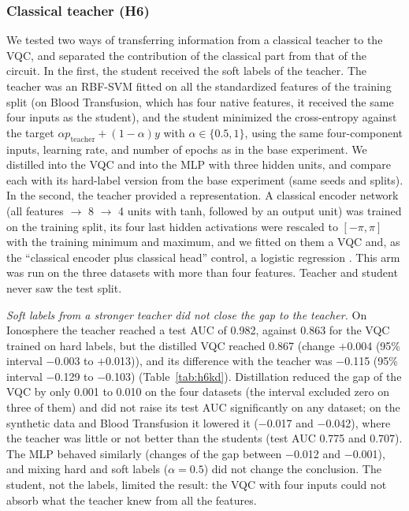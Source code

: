 \subsubsection{Classical teacher (H6)}

We tested two ways of transferring information from a classical teacher to the VQC, and separated the contribution of the classical part from that of the circuit. In the first, the student received the soft labels of the teacher. The teacher was an RBF-SVM fitted on all the standardized features of the training split (on Blood Transfusion, which has four native features, it received the same four inputs as the student), and the student minimized the cross-entropy against the target $\alpha p_{\mathrm{teacher}}+(1-\alpha)y$ with $\alpha\in\{0.5,1\}$, using the same four-component inputs, learning rate, and number of epochs as in the base experiment. We distilled into the VQC and into the MLP with three hidden units, and compare each with its hard-label version from the base experiment (same seeds and splits). In the second, the teacher provided a representation. A classical encoder network (all features $\rightarrow$ 8 $\rightarrow$ 4 units with tanh, followed by an output unit) was trained on the training split, its four last hidden activations were rescaled to $[-\pi,\pi]$ with the training minimum and maximum, and we fitted on them a VQC and, as the ``classical encoder plus classical head'' control, a logistic regression \cite{kolle2024}. This arm was run on the three datasets with more than four features. Teacher and student never saw the test split.

\textit{Soft labels from a stronger teacher did not close the gap to the teacher.} On Ionosphere the teacher reached a test AUC of 0.982, against 0.863 for the VQC trained on hard labels, but the distilled VQC reached 0.867 (change $+$0.004 (95\% interval $-$0.003 to $+$0.013)), and its difference with the teacher was $-$0.115 (95\% interval $-$0.129 to $-$0.103) (Table~\ref{tab:h6kd}). Distillation reduced the gap of the VQC by only 0.001 to 0.010 on the four datasets (the interval excluded zero on three of them) and did not raise its test AUC significantly on any dataset; on the synthetic data and Blood Transfusion it lowered it ($-$0.017 and $-$0.042), where the teacher was little or not better than the students (test AUC 0.775 and 0.707). The MLP behaved similarly (changes of the gap between $-$0.012 and $-$0.001), and mixing hard and soft labels ($\alpha=0.5$) did not change the conclusion. The student, not the labels, limited the result: the VQC with four inputs could not absorb what the teacher knew from all the features.


